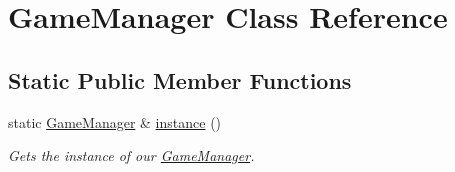 \hypertarget{class_game_manager}{}\section{Game\+Manager Class Reference}
\label{class_game_manager}
\subsection*{Static Public Member Functions}
\begin{DoxyCompactItemize}
\item 
static \hyperlink{class_game_manager}{Game\+Manager} \& \hyperlink{class_game_manager_afa37ab23c040b5225d567d4c9ab854e1}{instance} ()
\begin{DoxyCompactList}\small\item\em Gets the instance of our \hyperlink{class_game_manager}{Game\+Manager}. \end{DoxyCompactList}\end{DoxyCompactItemize}
